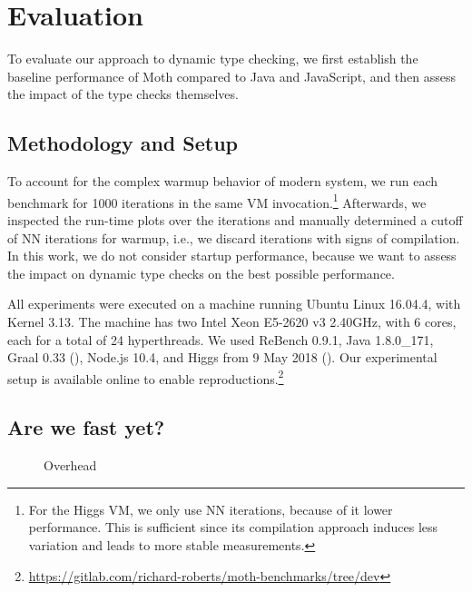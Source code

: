 
\section{Evaluation}
\label{sec:evaluation}


To evaluate our approach to dynamic type checking,
we first establish the baseline performance of Moth
compared to Java and JavaScript,
and then assess the impact of the type checks themselves.

\subsection{Methodology and Setup}

To account for the complex warmup behavior
of modern system\citep{Barrett:2017:VMW},
we run each benchmark for 1000 iterations in the same
VM invocation.\footnote{
For the Higgs VM, we only use NN iterations,
because of it lower performance.
This is sufficient since its compilation approach induces less variation
and leads to more stable measurements.}
Afterwards, we inspected the run-time plots over the iterations
and manually determined a cutoff of NN iterations for warmup,
i.e., we discard iterations with signs of compilation.
In this work, we do not consider startup performance,
because we want to assess the impact on dynamic type checks
on the best possible performance.

All experiments were executed on a machine running Ubuntu Linux 16.04.4,
with Kernel 3.13.
The machine has two Intel Xeon E5-2620 v3 2.40GHz,
with 6 cores, each for a total of 24 hyperthreads.
We used ReBench 0.9.1, Java 1.8.0\_171, Graal 0.33 (),
Node.js 10.4, and Higgs from 9 May 2018 ().
Our experimental setup is available online to enable reproductions.\footnote{
\url{https://gitlab.com/richard-roberts/moth-benchmarks/tree/dev}}


\subsection{Are we fast yet?}
\label{sec:baseline-perf}


\begin{figure}
	\AwfyBaseline{}
	\caption{Overhead}
	\label{fig:typing-overhead}
\end{figure}


